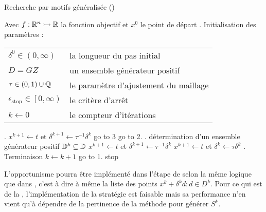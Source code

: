 \begin{algorithm}[H]
	\caption{\textsf{Recherche par motifs généralisée} (\GPS)}
	\label{alg1}
	\begin{algorithmic}
		\STATE Avec $f:\mathbb{R}^n \rightarrowtail \mathbb{R}$ la fonction objectif et $x^0$ le point de départ
		. \textsf{Initialisation des paramètres} : 
		\bindent
		\STATE\begin{flushleft}
			\begin{tabular}{l l}
				$\delta^0 \in (0,\infty)$ & la longueur du pas initial\\
				$D=GZ$ & un ensemble générateur positif\\
				$\tau \in (0,1) \cup \mathbb{Q}$ & le paramètre d'ajustement du maillage\\
				$\epsilon_{\text{stop}} \in \left[ 0,\infty \right) $ & le critère d'arrêt\\
				$k \leftarrow 0$ & le compteur d'itérations\\
			\end{tabular}
		\end{flushleft}
		\eindent
		. \SEARCH
		\bindent
		\STATE $x^{k+1} \leftarrow t$ et $\delta^{k+1} \leftarrow \tau ^{-1}\delta^k$
		\STATE go to 3
		\ELSE
		\STATE go to 2.
		\ENDIF
		\eindent
		. \POLL
		\bindent
		\STATE détermination d'un ensemble générateur positif $\mathbb{D}^k \subseteq \mathbb{D}$
		\STATE $x^{k+1} \leftarrow t$ et $\delta^{k+1} \leftarrow \tau ^{-1}\delta^k$
		\ELSE
		\STATE $x^{k+1} \leftarrow t$ et $\delta^{k} \leftarrow \tau\delta^k$
		\ENDIF
		\eindent
		. \textsf{Terminaison}
		\bindent
		\STATE $k\leftarrow k+1$
		\STATE go to 1.
		\ELSE
		\STATE stop
		\ENDIF
		\eindent
	\end{algorithmic}
\end{algorithm}
L'opportunisme pourra être implémenté dans l'étape de \POLL{} selon la même logique que dans \CS, c'est à dire à même la liste des points $x^k + \delta^k d : d \in D^k$. Pour ce qui est de la \SEARCH, l'implémentation de la stratégie est faisable mais sa performance n'en vient qu'à dépendre de la pertinence de la méthode pour générer $S^k$.
